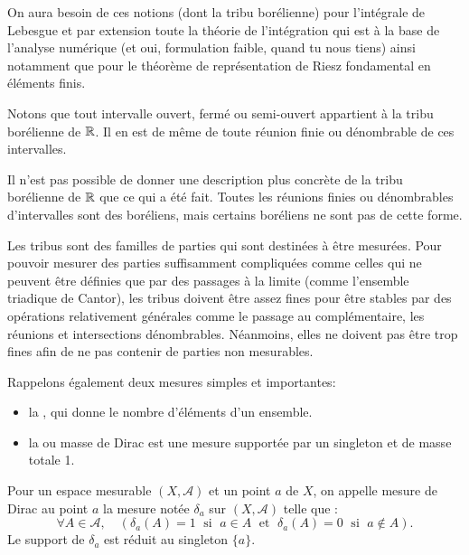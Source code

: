 On aura besoin de ces notions (dont la tribu borélienne) pour l'intégrale de Lebesgue et par extension
toute la théorie de l'intégration qui est à la base de l'analyse numérique (et oui, formulation faible, quand
tu nous tiens) ainsi notamment que pour le théorème  de représentation de Riesz fondamental en
éléments finis.

\medskip
Notons que tout intervalle ouvert, fermé ou semi-ouvert appartient à la tribu borélienne de $\mathbb R$.
Il en est de même de toute réunion finie ou dénombrable de ces intervalles.

\medskip
Il n'est pas possible de donner une description plus concrète de la tribu
borélienne de $\mathbb R$ que ce qui a été fait. Toutes les réunions finies ou dénombrables d'intervalles 
sont des boréliens, mais certains boréliens ne sont pas de cette forme. 

\medskip
Les tribus sont des familles de parties qui sont destinées à être mesurées. Pour pouvoir
mesurer des parties suffisamment compliquées comme celles qui ne peuvent être définies
que par des passages à la limite (comme l'ensemble triadique de Cantor),  
les tribus doivent être assez fines pour être stables par des opérations relativement générales comme
le passage au complémentaire, les réunions et intersections dénombrables. Néanmoins,
elles ne doivent pas être trop fines afin de ne pas contenir de parties non mesurables.

\medskip
Rappelons également deux mesures simples et importantes:
\begin{itemize}
   \item la , qui donne le nombre d'éléments d'un ensemble.
   \item la 
	ou masse de Dirac est une mesure supportée par un singleton et de masse totale 1.
\end{itemize}

\begin{definition}
Pour un espace mesurable $(X,\mathcal{A})$ et un point $a$ de $X$, on appelle mesure de Dirac au
point $a$ la mesure notée $\delta_a$ sur $(X, \mathcal{A})$ telle que :
\begin{equation}
    \forall A \in \mathcal{A},\quad ( \delta_a(A)=1 \; \text{ si } \; a \in A \; \text{ et } \; \delta_a(A)=0 \; \text{ si } \; a \notin A ).
\end{equation}
Le support de $\delta_a$ est réduit au singleton $\{a\}$.
\end{definition}

